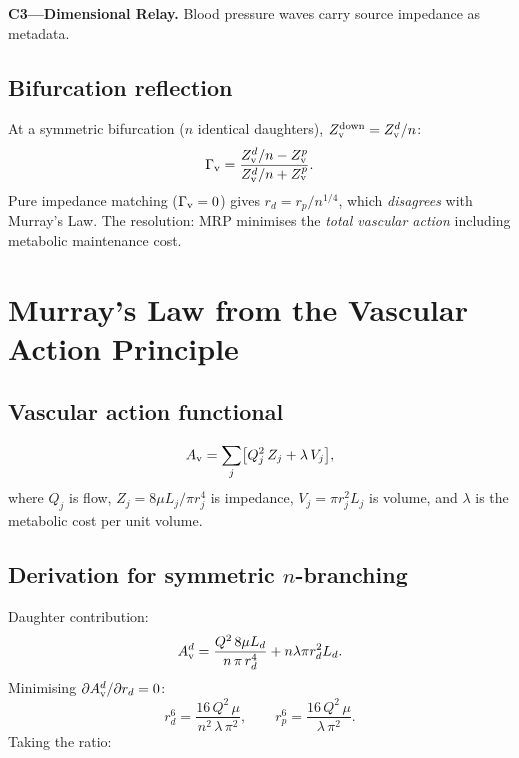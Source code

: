 \documentclass[aps,pre,twocolumn,superscriptaddress,floatfix]{revtex4-2}
\begin{document}
\textbf{C3---Dimensional Relay.}
Blood pressure waves carry source impedance as metadata.

\subsection{Bifurcation reflection}
\label{sec:bifurcation}

At a symmetric bifurcation ($n$ identical daughters),
$Z_{\text{v}}^{\text{down}} = Z_{\text{v}}^d / n$:
\begin{equation}
  \Gamma_{\text{v}} = \frac{Z_{\text{v}}^d/n - Z_{\text{v}}^p}{Z_{\text{v}}^d/n + Z_{\text{v}}^p}.
  \label{eq:bif-gamma}
\end{equation}
Pure impedance matching ($\Gamma_{\text{v}} = 0$) gives
$r_d = r_p / n^{1/4}$, which \emph{disagrees} with
Murray's Law.
The resolution: MRP minimises the \emph{total vascular
action} including metabolic maintenance cost.


\section{Murray's Law from the Vascular Action Principle}
\label{sec:murray}

\subsection{Vascular action functional}

\begin{equation}
  A_{\text{v}} = \sum_j \bigl[Q_j^2\,Z_j + \lambda\,V_j\bigr],
  \label{eq:vascular-action}
\end{equation}
where $Q_j$ is flow, $Z_j = 8\mu L_j/\pi r_j^4$
is impedance, $V_j = \pi r_j^2 L_j$ is volume, and
$\lambda$ is the metabolic cost per unit volume.

\subsection{Derivation for symmetric $n$-branching}

Daughter contribution:
\begin{equation}
  A_{\text{v}}^d = \frac{Q^2\,8\mu L_d}{n\,\pi\,r_d^4}
    + n\lambda\pi r_d^2 L_d.
  \label{eq:Av-daughter}
\end{equation}
Minimising $\partial A_{\text{v}}^d/\partial r_d = 0$:
\begin{equation}
  r_d^6 = \frac{16\,Q^2\,\mu}{n^2\,\lambda\,\pi^2},
  \qquad
  r_p^6 = \frac{16\,Q^2\,\mu}{\lambda\,\pi^2}.
  \label{eq:rd-rp-opt}
\end{equation}
Taking the ratio:
\end{document}
